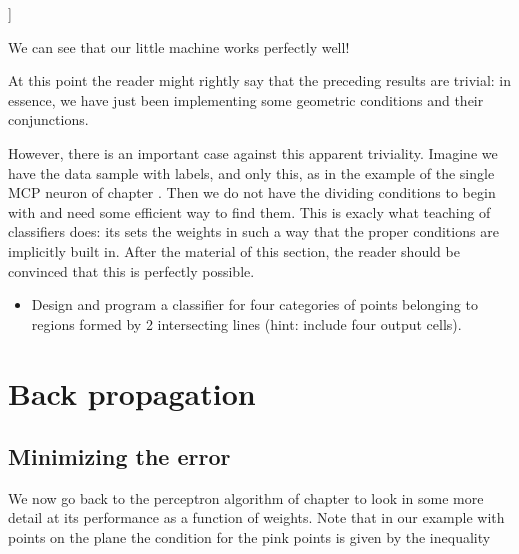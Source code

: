 \documentclass[letterpaper,10pt,english]{jupyterBook}
\begin{document}
\begin{sphinxVerbatim}[commandchars=\\\{\}]
[[0.83806748 0.62718519 0.        ]
 [0.46726263 0.34999938 1.        ]
 [0.69545367 0.95397076 0.        ]
 [0.19930639 0.52982584 1.        ]
 [0.41437336 0.69846145 0.        ]]
\end{sphinxVerbatim}

\noindent{}

\sphinxAtStartPar
We can see that our little machine works perfectly well!

\sphinxAtStartPar
At this point the reader might rightly say that the preceding results are trivial: in essence, we have just been implementing some geometric conditions and their conjunctions.

\sphinxAtStartPar
However, there is an important case against this apparent triviality. Imagine we have the data sample with labels, and only this, as in the example of the single MCP neuron of chapter {\hyperref[\detokenize{docs/mcp:mcp-lab}]{}}. Then we do not have the dividing conditions to begin with and need some efficient way to find them. This is exacly what teaching of classifiers does: its sets the weights in such a way that the proper conditions are implicitly built in. After the material of this section, the reader should be convinced that this is perfectly possible.
\begin{itemize}
\item {} 
\sphinxAtStartPar
Design and program a classifier for four categories of points belonging to regions formed by 2 intersecting lines (hint: include four output cells).

\end{itemize}


\chapter{Back propagation}
\label{\detokenize{docs/backprop:back-propagation}}\label{\detokenize{docs/backprop::doc}}

\section{Minimizing the error}
\label{\detokenize{docs/backprop:minimizing-the-error}}
\sphinxAtStartPar
We now go back to the perceptron algorithm of chapter {\hyperref[\detokenize{docs/perceptron:perc-lab}]{}} to look in some more detail at its performance as a function of weights. Note that in our example with points on the plane the condition for the pink points is given by the inequality
\end{document}
